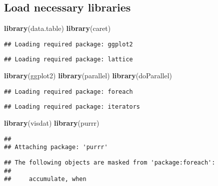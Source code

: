 \documentclass[
]{article}
\newenvironment{Shaded}{\begin{snugshade}}{\end{snugshade}}
\newcommand{\FunctionTok}[1]{\textcolor[rgb]{0.13,0.29,0.53}{\textbf{#1}}}
\newcommand{\NormalTok}[1]{#1}
\begin{document}
\hypertarget{load-necessary-libraries}{%
\subsection{Load necessary libraries}\label{load-necessary-libraries}}

\begin{Shaded}
\begin{Highlighting}[]
\FunctionTok{library}\NormalTok{(data.table)}
\FunctionTok{library}\NormalTok{(caret)}
\end{Highlighting}
\end{Shaded}

\begin{verbatim}
## Loading required package: ggplot2
\end{verbatim}

\begin{verbatim}
## Loading required package: lattice
\end{verbatim}

\begin{Shaded}
\begin{Highlighting}[]
\FunctionTok{library}\NormalTok{(ggplot2)}
\FunctionTok{library}\NormalTok{(parallel)}
\FunctionTok{library}\NormalTok{(doParallel)}
\end{Highlighting}
\end{Shaded}

\begin{verbatim}
## Loading required package: foreach
\end{verbatim}

\begin{verbatim}
## Loading required package: iterators
\end{verbatim}

\begin{Shaded}
\begin{Highlighting}[]
\FunctionTok{library}\NormalTok{(visdat)}
\FunctionTok{library}\NormalTok{(purrr)}
\end{Highlighting}
\end{Shaded}

\begin{verbatim}
## 
## Attaching package: 'purrr'
\end{verbatim}

\begin{verbatim}
## The following objects are masked from 'package:foreach':
## 
##     accumulate, when
\end{verbatim}
\end{document}
